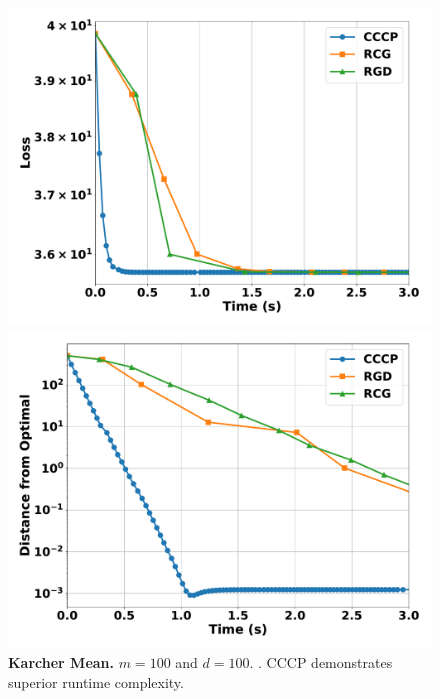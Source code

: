 \documentclass[sn-nature]{sn-jnl}%
\theoremstyle{thmstyleone}%
\theoremstyle{thmstyletwo}%
\theoremstyle{thmstylethree}%
\begin{document}
\begin{figure}[htbp]
  \centering
  \begin{minipage}[b]{0.45\textwidth}
    \centering
    \includegraphics[width=\textwidth]{figuresV2/karcher_mean/loss_time_100_100_medium.pdf}
  \end{minipage}
  \hfill
  \begin{minipage}[b]{0.45\textwidth}
    \centering
    \includegraphics[width=\textwidth]{figuresV2/karcher_mean/distance_time_100_100_medium.pdf}
  \end{minipage}
  \caption{\textbf{Karcher Mean.} $m=100$ and $d=100$. . CCCP demonstrates superior runtime complexity.}
  \label{fig:karcher_mean_100_100}
\end{figure}
\end{document}
